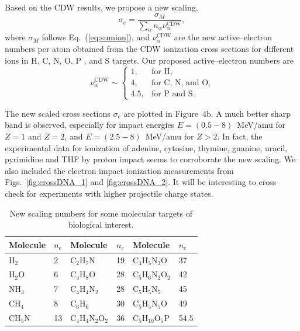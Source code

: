 \documentclass[preprint,12pt]{article}
\begin{document}
Based on the CDW results, we propose a new scaling,
\begin{equation}
\sigma_{e}=\frac{\sigma_M}{\sum\limits_{\alpha}n_{\alpha}
\nu_{\alpha}^{\text{CDW}}},
\label{32} 
\end{equation}
where $\sigma_M$ follows Eq.~(\ref{eq:sumion}), and 
$\nu_{\alpha}^{\text{CDW}}$ are the new active--electron numbers 
per atom obtained from the CDW ionization cross sections for 
different ions in H, C, N, O, P , and S targets. 
Our proposed active--electron numbers are
\begin{equation}
\nu_{\alpha }^{\text{CDW}} \sim\left\{ 
\begin{array}{ll}
1, & \text{for H,} \\
4, & \text{for C, N, and O,} \\ 
4.5, & \text{for P and S}\,.
\end{array}
\right. 
\label{eq:scalingCDW}
\end{equation}

The new scaled cross sections $\sigma_{e}$ are plotted in Figure~4b. 
A much better sharp band is observed, especially for impact energies 
$E=(0.5-8)$~MeV/amu for $Z=1$ and $Z=2$, and $E=(2.5-8)$~MeV/amu for 
$Z>2$. In fact, the experimental data for ionization of adenine, 
cytosine, thymine, guanine, uracil, pyrimidine and THF by proton impact 
seems to corroborate the new scaling. We also included the electron impact
ionization measurements from Figs.~\ref{fig:crossDNA_1} and 
\ref{fig:crossDNA_2}. It will be interesting to cross--check for 
experiments with higher projectile charge states. 

\begin{table}[H]
\begin{center}
\begin{tabular}{|ll|ll|ll|}
\hline
 Molecule & $n_e$ &Molecule         & $n_e$ & Molecule             & $n_e$ \\
\hline
 H$_2$    & 2  & C$_2$H$_7$N         & 19    & C$_4$H$_5$N$_3$O     & 37    \\
 H$_2$O   & 6  & C$_4$H$_8$O         & 28    & C$_5$H$_6$N$_2$O$_2$ & 42    \\
 NH$_3$   & 7  & C$_4$H$_4$N$_2$     & 28    & C$_5$H$_5$N$_5$      & 45    \\
 CH$_4$   & 8  & C$_6$H$_6$          & 30    & C$_5$H$_5$N$_5$O     & 49    \\
 CH$_5$N  & 13 & C$_4$H$_4$N$_2$O$_2$& 36    & C$_5$H$_{10}$O$_5$P  & 54.5  \\
 \hline
\end{tabular}
\caption{New scaling numbers for some molecular targets of biological interest.}
\label{nn}
\end{center}
\end{table}
\end{document}
